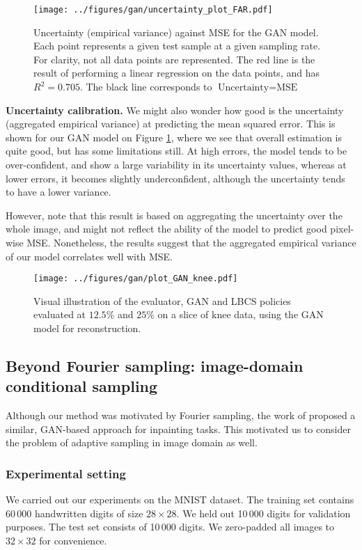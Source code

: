 \begin{figure}[!ht]
    \centering
    \texttt{[image: ../figures/gan/uncertainty\_plot\_FAR.pdf]}
    \caption{Uncertainty (empirical variance) against MSE for the GAN model. Each point represents a given test sample at a given sampling rate. For clarity, not all data points are represented. The red line is the result of performing a linear regression on the data points, and has $R^2=0.705$. The black line corresponds to $\text{Uncertainty}=\text{MSE}$}\label{fig:calibration}
    \end{figure}

\textbf{Uncertainty calibration.} We might also wonder how good is the uncertainty (aggregated empirical variance) at predicting the mean squared error. This is shown for our GAN model on Figure \ref{fig:calibration}, where we see that overall estimation is quite good, but has some limitations still. At high errors, the model tends to be over-confident, and show a large variability in its uncertainty values, whereas at lower errors, it becomes slightly underconfident, although the uncertainty tends to have a lower variance.

However, note that this result is based on aggregating the uncertainty over the whole image, and might not reflect the ability of the model to predict good pixel-wise MSE. Nonetheless, the results suggest that the aggregated empirical variance of our model correlates well with MSE.



\begin{figure}[!ht]
    \centering
    \texttt{[image: ../figures/gan/plot\_GAN\_knee.pdf]}
    \caption{Visual illustration of the evaluator, GAN and LBCS policies evaluated at $12.5\%$ and $25\%$ on a slice of knee data, using the GAN model for reconstruction.}\label{fig:knee_visual}
\end{figure}

\subsection{Beyond Fourier sampling: image-domain conditional sampling}
Although our method was motivated by Fourier sampling, the work of \citet{belghazi2019learning} proposed a similar, GAN-based approach for inpainting tasks. This motivated us to consider the problem of adaptive sampling in image domain as well. 




\subsubsection{Experimental setting}
We carried out our experiments on the MNIST dataset. The training set contains 60\,000 handwritten digits of size $28\times 28$. We held out 10\,000 digits for validation purposes. The test set consists of 10\,000 digits. We zero-padded all images to $32\times 32$ for convenience.

